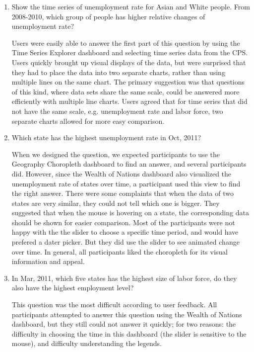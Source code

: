 \documentclass{sigchi}
\begin{document}
\begin{enumerate}
\item    Show the time series of unemployment rate for Asian and White people. From 2008-2010, which group of people has higher relative changes of unemployment rate?

Users were easily able to answer the first part of this question by using the Time Series Explorer dashboard and selecting time series data from the CPS. Users quickly brought up visual displays of the data, but were surprised that they had to place the data into two separate charts, rather than using multiple lines on the same chart. The primary suggestion was that questions of this kind, where data sets share the same scale, could be answered more efficiently with multiple line charts. Users agreed that for time series that did not have the same scale, e.g. unemployment rate and labor force, two separate charts allowed for more easy comparison.

\item    Which state has the highest unemployment rate in Oct, 2011?

When we designed the question, we expected participants to use the Geography Choropleth dashboard to find an answer, and several participants did. However, since the Wealth of Nations dashboard also visualized the unemployment rate of states over time, a participant used this view to find the right answer. There were some complaints that when the data of two states are very similar, they could not tell which one is bigger. They suggested that when the mouse is hovering on a state, the corresponding data should be shown for easier comparison. Most of the participants were not happy with the the slider to choose a specific time period, and would have prefered a dater picker. But they did use the slider to see animated change over time. In general, all participants liked the choropleth for its visual information and appeal.


\item    In Mar, 2011, which five states has the highest size of labor force, do they also have the highest employment level?

This question was the most difficult according to user feedback. All participants attempted to answer this question using the Wealth of Nations dashboard, but they still could not answer it quickly; for two reasons: the difficulty in choosing the time in this dashboard (the slider is sensitive to the mouse), and difficulty understanding the legends.


\end{enumerate}
\end{document}
